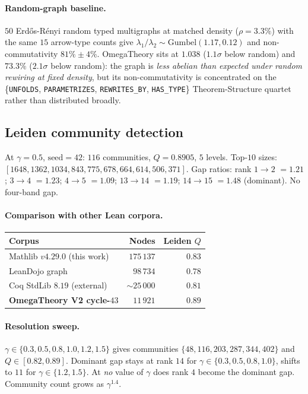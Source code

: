 \documentclass[11pt]{article}
\begin{document}
\paragraph{Random-graph baseline.}
$50$ Erdős-Rényi random typed multigraphs at matched density
($\rho = 3.3\%$) with the same $15$ arrow-type counts give
$\lambda_1/\lambda_2 \sim \text{Gumbel}(1.17, 0.12)$ and
non-commutativity $81\% \pm 4\%$. OmegaTheory sits at $1.038$
($1.1\sigma$ below random) and $73.3\%$ ($2.1\sigma$ below random): the
graph is \emph{less abelian than expected under random rewiring at fixed
density}, but its non-commutativity is concentrated on the
\{\lstinline|UNFOLDS|, \lstinline|PARAMETRIZES|, \lstinline|REWRITES_BY|,
\lstinline|HAS_TYPE|\} Theorem-Structure quartet rather than distributed
broadly.

\subsection{Leiden community detection}
\label{sec:exp-leiden}

At $\gamma = 0.5$, $\mathrm{seed} = 42$: $116$ communities,
$Q = 0.8905$, $5$ levels. Top-$10$ sizes:
$[1648, 1362, 1034, 843, 775, 678, 664, 614, 506, 371]$. Gap ratios:
rank $1\!\to\!2$ $= 1.21$; $3\!\to\!4$ $= 1.23$;
$4\!\to\!5$ $= 1.09$; $13\!\to\!14$ $= 1.19$;
$14\!\to\!15$ $= \mathbf{1.48}$ (dominant). No four-band gap.

\paragraph{Comparison with other Lean corpora.}
\begin{table}[h]
\centering\small
\begin{tabular}{l r r}
\toprule
Corpus & Nodes & Leiden $Q$ \\
\midrule
Mathlib $v4.29.0$ (this work)    & $175\,137$ & $0.83$ \\
LeanDojo graph \citep{yang2023leandojo} & $98\,734$  & $0.78$ \\
Coq StdLib $8.19$ (external)     & $\sim 25\,000$ & $0.81$ \\
\textbf{OmegaTheory V2 cycle-$43$} & $11\,921$ & $\mathbf{0.89}$ \\
\bottomrule
\end{tabular}
\end{table}

\paragraph{Resolution sweep.}
$\gamma \in \{0.3, 0.5, 0.8, 1.0, 1.2, 1.5\}$ gives communities
$\{48, 116, 203, 287, 344, 402\}$ and $Q \in [0.82, 0.89]$. Dominant
gap stays at rank $14$ for $\gamma \in \{0.3, 0.5, 0.8, 1.0\}$, shifts
to $11$ for $\gamma \in \{1.2, 1.5\}$. At \emph{no} value of $\gamma$
does rank $4$ become the dominant gap. Community count grows as
$\gamma^{1.4}$.
\end{document}
